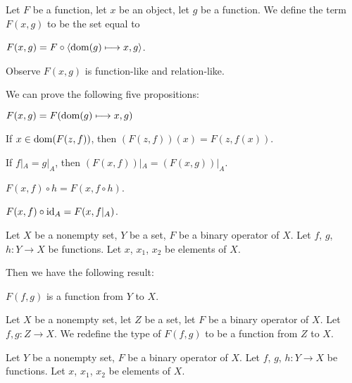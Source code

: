 \documentclass{article}
\begin{document}
\begin{definition}
Let $F$ be a function, let $x$ be an object, let $g$ be a function.
We define the term $F(x,g)$ to be the set equal to
\begin{defn}
\item $F(x,g)=F\circ\langle\operatorname{dom}(g)\longmapsto x,g\rangle$.
\end{defn}
\end{definition}

Observe $F(x,g)$ is function-like and relation-like.

We can prove the following five propositions:
\begin{thm}
\item\label{funcop1:31} $F(x,g)=F(\operatorname{dom}(g)\longmapsto x,g)$
\item\label{funcop1:32} If $x\in\operatorname{dom}(F(z,f))$, then $(F(z,f))(x)=F(z,f(x))$.
\item\label{funcop1:33} If $f|_{A}=g|_{A}$,
  then $(F(x,f))|_{A}=(F(x,g))|_{A}$.
\item\label{funcop1:34} $F(x,f)\circ h=F(x,f\circ h)$.
\item\label{funcop1:35} $F(x,f)\circ\operatorname{id}_{A}=F(x,f|_{A})$.
\end{thm}

Let $X$ be a nonempty set, $Y$ be a set, $F$ be a binary operator of $X$.
Let $f$, $g$, $h\colon Y\to X$ be functions. Let $x$, $x_{1}$, $x_{2}$
be elements of $X$.

Then we have the following result:
\begin{thm}
\item\label{funcop1:36} $F(f,g)$ is a function from $Y$ to $X$.
\end{thm}

\begin{definition}
Let $X$ be a nonempty set, let $Z$ be a set, let $F$ be a binary
operator of $X$. Let $f,g\colon Z\to X$.
We redefine the type of $F(f,g)$ to be a function from $Z$ to $X$.
\end{definition}

Let $Y$ be a nonempty set, $F$ be a binary operator of $X$.
Let $f$, $g$, $h\colon Y\to X$ be functions. Let $x$, $x_{1}$, $x_{2}$
be elements of $X$.
\end{document}
